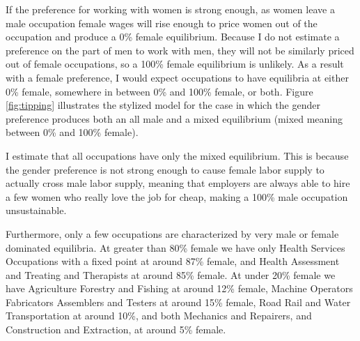 \documentclass[11pt]{article}
\begin{document}
If the preference for working with women is strong enough, as women leave a male occupation female wages will rise enough to price women out of the occupation and produce a 0\% female equilibrium. Because I do not estimate a preference on the part of men to work with men, they will not be similarly priced out of female occupations, so a 100\% female equilibrium is unlikely. As a result with a female preference, I would expect occupations to have equilibria at either 0\% female, somewhere in between 0\% and 100\% female, or both. Figure \ref{fig:tipping} illustrates the stylized model for the case in which the gender preference produces both an all male and a mixed equilibrium (mixed meaning between 0\% and 100\% female). 



I estimate that all occupations have only the mixed equilibrium. This is because the gender preference is not strong enough to cause female labor supply to actually cross male labor supply, meaning that employers are always able to hire a few women who really love the job for cheap, making a 100\% male occupation unsustainable.


Furthermore, only a few occupations are characterized by very male or female dominated equilibria. At greater than 80\% female we have only Health Services Occupations with a fixed point at around 87\% female, and Health Assessment and Treating and Therapists at around 85\% female. At under 20\% female we have Agriculture Forestry and Fishing at around 12\% female, Machine Operators Fabricators Assemblers and Testers at around 15\% female, Road Rail and Water Transportation at around 10\%, and both Mechanics and Repairers, and Construction and Extraction, at around 5\% female.
\end{document}
